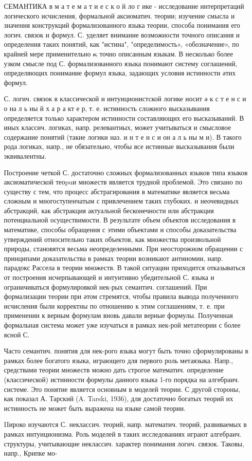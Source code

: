 \documentclass[10pt]{article}
\begin{document}
СЕМАНТИКА в м а т е м а т и е с к о й ло г ике - исследование интерпретаций логического исчисления, формальной аксиоматич. теории; изучение смысла и значения конструкций формализованного языка теории, способа понимания его логич. связок и формул. С. уделяет внимание возможности точного описания и определения таких понятий, как "истина", "определимость», «обозначение», по крайней мере применительно $\boldsymbol{\kappa}$ точно описанным языкам. В несколько более узком смысле под С. формализованного языка понимают систему соглашений, определяющих понимание формул языка, задающих условия истинности әтих формул.



С. логич. связок в классической и интуиционистской логике носит ә к с т е н с и о на л ь ны й х а р а кт е р, т. е. истинность сложного высказывания определяется только характером истинности составляющих его высказываний. В иных классич. логиках, напр. релевантных, может учитываться и смысловое содержание понятий (такие логики наз. и н т е н с и он а л ь ны м и). В такого рода логиках, напр., не обязательно, чтобы все истинные высказывания были эквивалентны.



Построение четкой С. достаточно сложных формализованных языков типа языков аксиоматической теоpuи множеств является трудной проблемой. Это связано по существу с тем, что процесс абстрагирования в математике является весьма сложным и многоступенчатым с привлечением таких глубоких. и неочевидных абстракций, как абстракция актуальной бесконечности или абстракция потенциальной осуществимости. В результате объем объектов исследования в математике, способы обращения с этими объектами и способы доказательства утверждений относительно таких объектов, как множества произвольной природы, становятся весьма неопределенными. При неосторожном обращении с принципами доказательства в рамках теории возникают антиномии, напр. парадокс Рассела в теории множеств. В такой ситуации приходится отказываться от построения исчерпывающей и интуитивно убедительной С. языка и ограничиваться формулировкой нек-рых семантич. соглашений. При формализации теории при әтом стремятся, чтобы правила вывода полученного исчисления были корректны по отношению к этим соглашениям, т. е. при применении к верным формулам вновь давали верные формулы. Полученная формальная система может уже изучаться в рамках нек-рой метатеории с более ясной С.



Часто семантич. понятия для нек-рого языка могут быть точно сформулированы в рамках более богатого языка, играющего для первого роль метаязыка. Напр., средствами теории множеств можно дать строгое математич. определение (классической) истинности формулы данного языка 1-го порядка на алгебраич. системе. Это понятие является основным в моделей теории. С другой стороны, как показал А. Тарский (A. Tarski, 1936), для достаточно богатых теорий их истинность не может быть выражена на языке самой теории.



IIироко изучаются С. неклассич. теорий, напр. математич. теорий, развиваемых в рамках интуиционизма. Роль моделей в таких исследованиях играют алгебраич. структуры, учитывающие неклассич. характер понимания логич. связок. Таковы, напр., Крипке мо-
\end{document}

